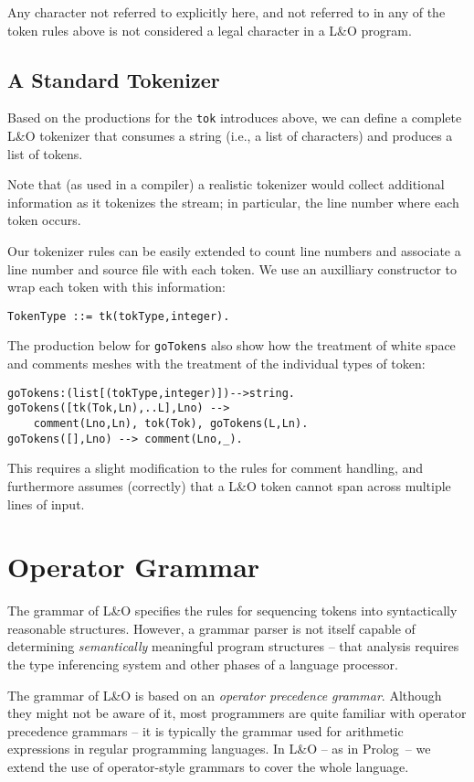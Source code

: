 Any character not referred to explicitly here, and not referred to in any of the token rules above is not considered a legal character in a L&O program.

\subsection{A Standard Tokenizer}

Based on the productions for the \verb+tok+ introduces above, we can define a complete L&O tokenizer that consumes a string (i.e., a list of characters) and produces a list of tokens.

Note that (as used in a compiler) a realistic tokenizer would collect additional information as it tokenizes the stream; in particular, the line number where each token occurs.

Our tokenizer rules can be easily extended to count line numbers and associate a line number and source file with each token. We use an auxilliary constructor to wrap each token with this information:
\begin{verbatim}
TokenType ::= tk(tokType,integer).
\end{verbatim}
The production below for \verb+goTokens+ also show how the treatment of white space and comments meshes with the treatment of the individual types of token:
\begin{verbatim}
goTokens:(list[(tokType,integer)])-->string.
goTokens([tk(Tok,Ln),..L],Lno) -->
    comment(Lno,Ln), tok(Tok), goTokens(L,Ln).
goTokens([],Lno) --> comment(Lno,_).
\end{verbatim}

This requires a slight modification to the rules for comment handling, and furthermore assumes (correctly) that a L&O token cannot span across multiple lines of input.

\section{Operator Grammar}
\label{parser:grammar}
The grammar of L&O specifies the rules for sequencing tokens into syntactically reasonable structures. However, a grammar parser is not itself capable of determining \emph{semantically} meaningful program structures -- that analysis requires the type inferencing system and other phases of a language processor.

The grammar of L&O is based on an \emph{operator precedence grammar}. Although they might not be aware of it, most programmers are quite familiar with operator precedence grammars -- it is typically the grammar used for arithmetic expressions in regular programming languages. In L&O -- as in Prolog\ -- we extend the use of operator-style grammars to cover the whole language.

